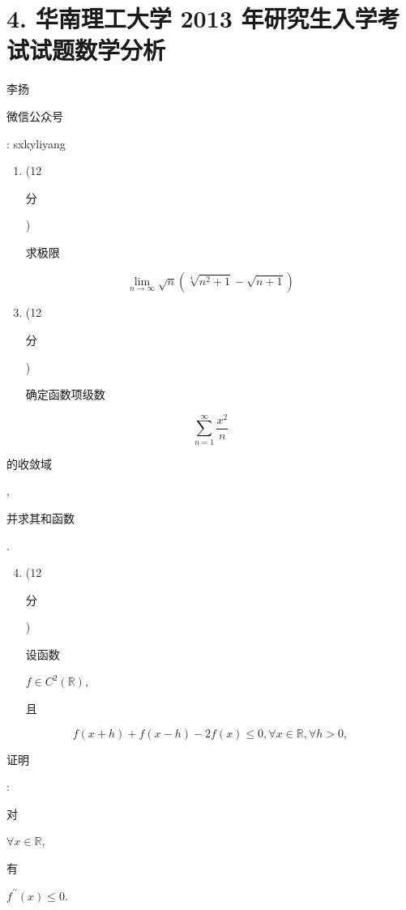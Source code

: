 \documentclass[10pt]{article}
\begin{document}
\section{4. 华南理工大学 2013 年研究生入学考试试题数学分析}
\begin{CJK}{UTF8}{mj}李扬\end{CJK}

\begin{CJK}{UTF8}{mj}微信公众号\end{CJK}: sxkyliyang

\begin{enumerate}
  \item (12 \begin{CJK}{UTF8}{mj}分\end{CJK}) \begin{CJK}{UTF8}{mj}求极限\end{CJK}
\end{enumerate}
$$
\lim _{n \rightarrow \infty} \sqrt{n}\left(\sqrt[4]{n^{2}+1}-\sqrt{n+1}\right)
$$

\begin{enumerate}
  \setcounter{enumi}{2}
  \item (12 \begin{CJK}{UTF8}{mj}分\end{CJK}) \begin{CJK}{UTF8}{mj}确定函数项级数\end{CJK}
\end{enumerate}
$$
\sum_{n=1}^{\infty} \frac{x^{2}}{n}
$$
\begin{CJK}{UTF8}{mj}的收敛域\end{CJK}, \begin{CJK}{UTF8}{mj}并求其和函数\end{CJK}.

\begin{enumerate}
  \setcounter{enumi}{3}
  \item (12 \begin{CJK}{UTF8}{mj}分\end{CJK}) \begin{CJK}{UTF8}{mj}设函数\end{CJK} $f \in C^{2}(\mathbb{R})$, \begin{CJK}{UTF8}{mj}且\end{CJK}
\end{enumerate}
$$
f(x+h)+f(x-h)-2 f(x) \leq 0, \forall x \in \mathbb{R}, \forall h>0,
$$
\begin{CJK}{UTF8}{mj}证明\end{CJK}: \begin{CJK}{UTF8}{mj}对\end{CJK} $\forall x \in \mathbb{R}$, \begin{CJK}{UTF8}{mj}有\end{CJK} $f^{\prime \prime}(x) \leq 0$.
\end{document}
